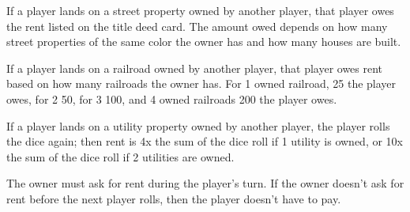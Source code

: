 If a player lands on a street property owned by another player, that player owes the rent listed on the title deed card. The amount owed depends on how many street properties of the same color the owner has and how many houses are built.

If a player lands on a railroad owned by another player, that player owes rent based on how many railroads the owner has. For 1 owned railroad, 25 the player owes, for 2 50, for 3 100, and 4 owned railroads 200 the player owes.

If a player lands on a utility property owned by another player, the player rolls the dice again; then rent is 4x the sum of the dice roll if 1 utility is owned, or 10x the sum of the dice roll if 2 utilities are owned.

The owner must ask for rent during the player’s turn. If the owner doesn’t ask for rent before the next player rolls, then the player doesn’t have to pay.